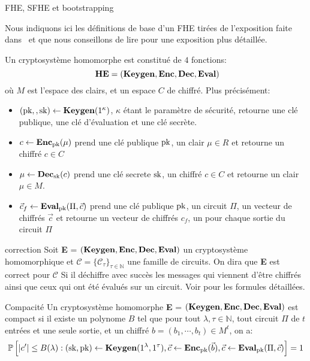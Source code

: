 \begin{section}{FHE, SFHE et bootstrapping}


Nous indiquons ici les définitions de base d'un FHE tirées de 
l'exposition faite dans~\cite{halevi} et que nous conseillons 
de lire pour une exposition plus détaillée.

\begin{definition}
Un cryptosystème homomorphe est constitué de $4$ fonctions:
\[ \text{\textbf{HE}} = (\Keygen, \Enc, \Dec, \Eval)\]
où $M$ est  l'espace des clairs, et un espace $C$ de chiffré. Plus précisément:
\begin{itemize}
\item $(\text{pk},, \text{sk}) \leftarrow \text{\textbf{Keygen}}(1^\kappa)$, $\kappa$ étant le paramètre de sécurité, retourne une clé publique, une clé d'évaluation et une clé secrète.
\item $c \leftarrow \text{\textbf{Enc}}_{\text{pk}}(\mu)$ prend une clé publique $\text{pk}$, un clair $\mu \in R$ et retourne un chiffré $c\in C$
\item $\mu \leftarrow \text{\textbf{Dec}}_{\text{sk}}(c)$ prend une clé secrete $\text{sk}$, un chiffré $c \in C$ et retourne un clair $\mu \in M$.
\item $\vec{c}_f \leftarrow \text{\textbf{Eval}}_{\text{pk}}(\Pi,\vec{c})$ prend une clé publique
$\text{pk}$, un circuit  $\Pi$, un vecteur de chiffrés $\vec{c}$ et retourne un
vecteur de chiffrés $c_f$, un pour chaque sortie du circuit $\Pi$
\end{itemize}
\end{definition}

\begin{definition}{correction}
Soit \textbf{E} = $(\text{\textbf{Keygen}}, \text{\textbf{Enc}}, \text{\textbf{Dec}}, \text{\textbf{Eval}})$ un cryptosystème homomorphique
et  $\mathcal{C} = \{ \mathcal{C}_\tau\}_{\tau \in \mathbb{N}}$ une famille de
circuits.  On dira que \textbf{E} est correct pour $\mathcal{C}$
Si il déchiffre avec succès les messages qui viennent d'être chiffrés 
ainsi que ceux qui ont été évalués sur un circuit. Voir \cite{halevi} pour les
formules détaillées.
\end{definition}

\begin{definition}{Compacité}
Un cryptosystème homomorphe \textbf{E} = $(\text{\textbf{Keygen}}, \text{\textbf{Enc}}, \text{\textbf{Dec}}, \text{\textbf{Eval}})$ 
est compact si il existe un polynome $B$ tel que pour tout $\lambda, \tau
\in \mathbb{N}$, tout circuit $\Pi$ de $t$ entrées et une seule sortie, et un
chiffré $b = (b_1,\cdots,b_t) \in M^t$, on a:
\[ 
\mathbb{P} \left[ |c'| \leq B(\lambda): (\text{sk},\text{pk}) \leftarrow \text{\textbf{Keygen}}(1^\lambda,
1^\tau), \vec{c} \leftarrow \text{\textbf{Enc}}_{\text{pk}}(\vec{b}), \vec{c} \leftarrow 
\text{\textbf{Eval}}_{\text{pk}}(\Pi, \vec{c}) \right] = 1
\]
\end{definition}


\end{section}
